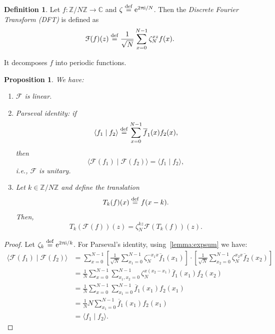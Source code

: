 \documentclass[12pt]{amsart}
\theoremstyle{plain}
\newtheorem{proposition}[theorem]{Proposition}
\theoremstyle{definition}
\newtheorem{definition}[theorem]{Definition}
\theoremstyle{remarks}
\newcommand{\Z}{\mathbb{Z}}
\newcommand{\C}{\mathbb{C}}
\newcommand{\me}{\mathrm{e}}
\newcommand{\mi}{\mathrm{i}}
\newcommand{\mpi}{\uppi}
\newcommand{\idef}{\overset{{\rm def}}{=}}
\renewcommand{\bar}{\overline}
\newcommand{\ft}{\mathcal{F}}  %
\begin{document}
\begin{definition}
  Let $f : \Z/{N}\Z \to \C$ and $\zeta \idef \me^{2\mpi\mi/N}$.  Then the \emph{Discrete Fourier Transform (DFT)} is defined as
  \[
    \ft(f)(z) \idef \frac{1}{\sqrt{N}} \sum_{x=0}^{N-1} \zeta_N^{xz} f(x).
  \]
\end{definition}

It decomposes $f$ into periodic functions.


\begin{proposition}
  We have:
  \begin{enumerate}

  \item $\ft$ is linear.

  \item \emph{Parseval identity}: if
    \[
      \langle f_1 \mid f_2 \rangle \idef \sum_{x=0}^{N-1} \bar{f}_1(x) f_2(x),
    \]
    then
    \[
      \langle \ft(f_1) \mid \ft(f_2) \rangle = \langle f_1 \mid f_2 \rangle,
    \]
    i.e., $\ft$ is unitary.

  \item Let $k \in \Z/{N}\Z$ and define the translation
    \[
      T_k(f)(x) \idef f(x - k).
    \]
    Then,
    \[
      T_k(\ft(f))(z) = \zeta_N^{kz} \ft(T_k(f))(z).
    \]

  \end{enumerate}
\end{proposition}

\begin{proof}
  Let $\zeta_k \idef \me^{2 \mpi \mi/k}$.   For Parseval's identity, using~\vref{lemma:expsum} we have:
  \begin{align*}
    \langle \ft(f_1) \mid \ft(f_2) \rangle
    &= \sum_{x=0}^{N-1} \left[ \frac{1}{\sqrt{N}} \sum_{x_1=0}^{N-1} \zeta_N^{-x_1x} \bar{f}_1(x_1)\right] \cdot \left[ \frac{1}{\sqrt{N}} \sum_{x_2=0}^{N-1} \zeta_N^{x_2x} \bar{f}_2(x_2)\right] \\
    &= \frac{1}{N} \sum_{x=0}^{N-1} \sum_{x_1, x_2=0}^{N-1} \zeta_N^{x(x_2 - x_1)} \bar{f}_1(x_1) f_2(x_2) \\
    &= \frac{1}{N} \sum_{x=0}^{N-1} \sum_{x_1=0}^{N-1} \bar{f}_1(x_1) f_2(x_1) \\
    &= \frac{1}{N} N \sum_{x_1=0}^{N-1} \bar{f}_1(x_1) f_2(x_1) \\
    &= \langle f_1 \mid f_2 \rangle.
  \end{align*}
\end{proof}
\end{document}
